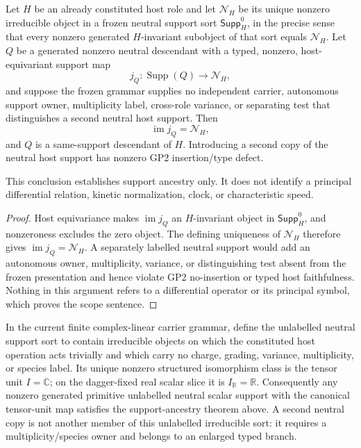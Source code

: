 \documentclass[12pt,a4paper]{article}
\begin{document}
\begin{theorem}
\label{p2a:thm:unique-neutral-support-ancestry}
Let \(H\) be an already constituted host role and let
\(\mathcal N_H\) be its unique nonzero irreducible object in a frozen neutral
support sort \(\mathsf{Supp}^0_H\), in the precise sense that every nonzero
generated \(H\)-invariant subobject of that sort equals \(\mathcal N_H\).
Let \(Q\) be a generated nonzero neutral descendant with a typed, nonzero,
host-equivariant support map
\[
 j_Q:\operatorname{Supp}(Q)\longrightarrow\mathcal N_H,
\]
and suppose the frozen grammar supplies no independent carrier, autonomous
support owner, multiplicity label, cross-role variance, or separating test that
distinguishes a second neutral host support.  Then
\[
 \boxed{\operatorname{im}j_Q=\mathcal N_H,}
\]
and \(Q\) is a same-support descendant of \(H\).  Introducing a second copy of
the neutral host support has nonzero GP2 insertion/type defect.

This conclusion establishes support ancestry only.  It does not identify a
principal differential relation, kinetic normalization, clock, or
characteristic speed.
\end{theorem}

\begin{proof}
Host equivariance makes \(\operatorname{im}j_Q\) an \(H\)-invariant object in
\(\mathsf{Supp}^0_H\), and nonzeroness excludes the zero object.  The defining
uniqueness of \(\mathcal N_H\) therefore gives
\(\operatorname{im}j_Q=\mathcal N_H\).  A separately labelled neutral support
would add an autonomous owner, multiplicity, variance, or distinguishing test
absent from the frozen presentation and hence violate GP2 no-insertion or
typed host faithfulness.  Nothing in this argument refers to a differential
operator or its principal symbol, which proves the scope sentence.
\end{proof}

\begin{corollary}
\label{p2a:cor:unique-neutral-tensor-unit-support}
In the current finite complex-linear carrier grammar, define the unlabelled
neutral support sort to contain irreducible objects on which the constituted
host operation acts trivially and which carry no charge, grading, variance,
multiplicity, or species label.  Its unique nonzero structured isomorphism
class is the tensor unit \(I=\mathbb C\); on the dagger-fixed real scalar
slice it is \(I_{\mathbb R}=\mathbb R\).  Consequently any nonzero generated
primitive unlabelled neutral scalar support with the canonical tensor-unit
map satisfies the support-ancestry theorem above.  A second neutral copy is
not another member of this unlabelled irreducible sort: it requires a
multiplicity/species owner and belongs to an enlarged typed branch.
\end{corollary}
\end{document}
